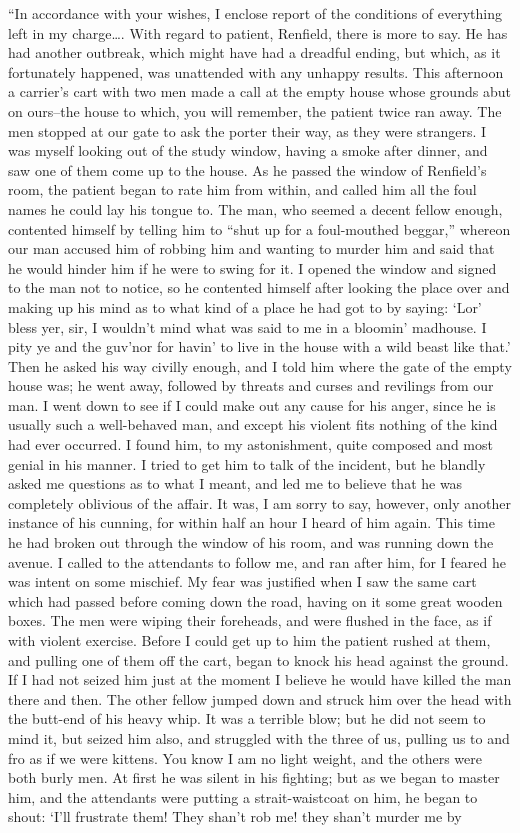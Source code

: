 \documentclass[12pt,openright]{book}
\begin{document}
“In accordance with your wishes, I enclose report of the conditions of everything left in my charge…. With regard to patient, Renfield, there is more to say. He has had another outbreak, which might have had a dreadful ending, but which, as it fortunately happened, was unattended with any unhappy results. This afternoon a carrier’s cart with two men made a call at the empty house whose grounds abut on ours–the house to which, you will remember, the patient twice ran away. The men stopped at our gate to ask the porter their way, as they were strangers. I was myself looking out of the study window, having a smoke after dinner, and saw one of them come up to the house. As he passed the window of Renfield’s room, the patient began to rate him from within, and called him all the foul names he could lay his tongue to. The man, who seemed a decent fellow enough, contented himself by telling him to “shut up for a foul-mouthed beggar,” whereon our man accused him of robbing him and wanting to murder him and said that he would hinder him if he were to swing for it. I opened the window and signed to the man not to notice, so he contented himself after looking the place over and making up his mind as to what kind of a place he had got to by saying: ‘Lor’ bless yer, sir, I wouldn’t mind what was said to me in a bloomin’ madhouse. I pity ye and the guv’nor for havin’ to live in the house with a wild beast like that.’ Then he asked his way civilly enough, and I told him where the gate of the empty house was; he went away, followed by threats and curses and revilings from our man. I went down to see if I could make out any cause for his anger, since he is usually such a well-behaved man, and except his violent fits nothing of the kind had ever occurred. I found him, to my astonishment, quite composed and most genial in his manner. I tried to get him to talk of the incident, but he blandly asked me questions as to what I meant, and led me to believe that he was completely oblivious of the affair. It was, I am sorry to say, however, only another instance of his cunning, for within half an hour I heard of him again. This time he had broken out through the window of his room, and was running down the avenue. I called to the attendants to follow me, and ran after him, for I feared he was intent on some mischief. My fear was justified when I saw the same cart which had passed before coming down the road, having on it some great wooden boxes. The men were wiping their foreheads, and were flushed in the face, as if with violent exercise. Before I could get up to him the patient rushed at them, and pulling one of them off the cart, began to knock his head against the ground. If I had not seized him just at the moment I believe he would have killed the man there and then. The other fellow jumped down and struck him over the head with the butt-end of his heavy whip. It was a terrible blow; but he did not seem to mind it, but seized him also, and struggled with the three of us, pulling us to and fro as if we were kittens. You know I am no light weight, and the others were both burly men. At first he was silent in his fighting; but as we began to master him, and the attendants were putting a strait-waistcoat on him, he began to shout: ‘I’ll frustrate them! They shan’t rob me! they shan’t murder me by 
\end{document}
